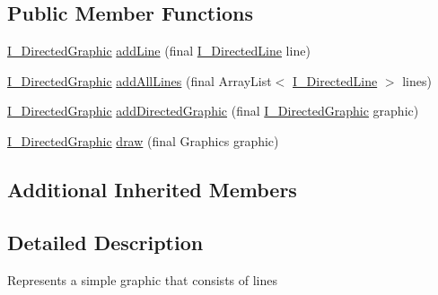 \subsection*{Public Member Functions}
\begin{DoxyCompactItemize}
\item 
\hyperlink{interfaceorg_1_1tzi_1_1use_1_1gui_1_1views_1_1diagrams_1_1util_1_1_i___directed_graphic}{I\-\_\-\-Directed\-Graphic} \hyperlink{classorg_1_1tzi_1_1use_1_1gui_1_1views_1_1diagrams_1_1util_1_1_simple_directed_graphic_ace786a326c6028f5b6c58a57d4803da8}{add\-Line} (final \hyperlink{interfaceorg_1_1tzi_1_1use_1_1gui_1_1views_1_1diagrams_1_1util_1_1_i___directed_line}{I\-\_\-\-Directed\-Line} line)
\item 
\hyperlink{interfaceorg_1_1tzi_1_1use_1_1gui_1_1views_1_1diagrams_1_1util_1_1_i___directed_graphic}{I\-\_\-\-Directed\-Graphic} \hyperlink{classorg_1_1tzi_1_1use_1_1gui_1_1views_1_1diagrams_1_1util_1_1_simple_directed_graphic_a3ff2219fcd6c1bbad79ac01dbdcb9f53}{add\-All\-Lines} (final Array\-List$<$ \hyperlink{interfaceorg_1_1tzi_1_1use_1_1gui_1_1views_1_1diagrams_1_1util_1_1_i___directed_line}{I\-\_\-\-Directed\-Line} $>$ lines)
\item 
\hyperlink{interfaceorg_1_1tzi_1_1use_1_1gui_1_1views_1_1diagrams_1_1util_1_1_i___directed_graphic}{I\-\_\-\-Directed\-Graphic} \hyperlink{classorg_1_1tzi_1_1use_1_1gui_1_1views_1_1diagrams_1_1util_1_1_simple_directed_graphic_a25115b1272a0f3c29328d06089326367}{add\-Directed\-Graphic} (final \hyperlink{interfaceorg_1_1tzi_1_1use_1_1gui_1_1views_1_1diagrams_1_1util_1_1_i___directed_graphic}{I\-\_\-\-Directed\-Graphic} graphic)
\item 
\hyperlink{interfaceorg_1_1tzi_1_1use_1_1gui_1_1views_1_1diagrams_1_1util_1_1_i___directed_graphic}{I\-\_\-\-Directed\-Graphic} \hyperlink{classorg_1_1tzi_1_1use_1_1gui_1_1views_1_1diagrams_1_1util_1_1_simple_directed_graphic_a61a0c13d65cf6965ba252ed6bf29eade}{draw} (final Graphics graphic)
\end{DoxyCompactItemize}
\subsection*{Additional Inherited Members}


\subsection{Detailed Description}
Represents a simple graphic that consists of lines 

